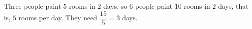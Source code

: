 Three people paint $5$ rooms in $2$ days, so $6$ people paint $10$ rooms in $2$ days, that is, $5$ rooms per day. They need $\dfrac{15}{5}=\boxed{3}$ days.
